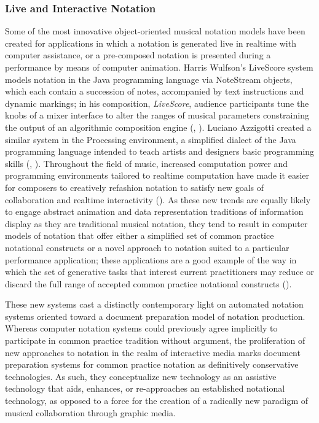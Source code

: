 \subsubsection{Live and Interactive Notation}
Some of the most innovative object-oriented musical notation models have been created for applications in which a notation is generated live in realtime with computer assistance, or a pre-composed notation is presented during a performance by means of computer animation. Harris Wulfson's LiveScore system models notation in the Java programming language via NoteStream objects, which each contain a succession of notes, accompanied by text instructions and dynamic markings; in his composition, \emph{LiveScore}, audience participants tune the knobs of a mixer interface to alter the ranges of musical parameters constraining the output of an algorithmic composition engine (\cite{wulfson2007automatic}, \cite{Barrett:2010dq}). Luciano Azzigotti created a similar system in the Processing environment, a simplified dialect of the Java programming language intended to teach artists and designers basic programming skills (\cite{reas2007processing}, \cite{Azziggoti:2012bh}). Throughout the field of music, increased computation power and programming environments tailored to realtime computation have made it easier for composers to creatively refashion notation to satisfy new goals of collaboration and realtime interactivity (\cite{Balachandran:2012cr}). As these new trends are equally likely to engage abstract animation and data representation traditions of information display as they are traditional musical notation, they tend to result in computer models of notation that offer either a simplified set of common practice notational constructs or a novel approach to notation suited to a particular performance application; these applications are a good example of the way in which the set of generative tasks that interest current practitioners may reduce or discard the full range of accepted common practice notational constructs (\cite{Collins:2011nx}).

These new systems cast a distinctly contemporary light on automated notation systems oriented toward a document preparation model of notation production. Whereas computer notation systems could previously agree implicitly to participate in common practice tradition without argument, the proliferation of new approaches to notation in the realm of interactive media marks document preparation systems for common practice notation as definitively conservative technologies. As such, they conceptualize new technology as an assistive technology that aids, enhances, or re-approaches an established notational technology, as opposed to a force for the creation of a radically new paradigm of musical collaboration through graphic media.

